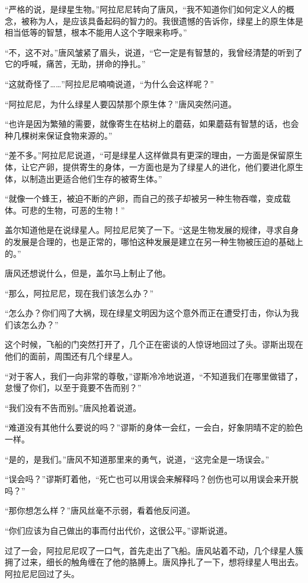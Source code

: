 “严格的说，是绿星生物。”阿拉尼尼转向了唐风，“我不知道你们如何定义人的概念，被称为人，是应该具备起码的智力的。我很遗憾的告诉你，绿星上的原生体是相当低等的智慧，根本不能用人这个字眼来称呼。”

“不，这不对。”唐风皱紧了眉头，说道，“它一定是有智慧的，我曾经清楚的听到了它的呼喊，痛苦，无助，拼命的挣扎。”

“这就奇怪了……”阿拉尼尼喃喃说道，“为什么会这样呢？”

“阿拉尼尼，为什么绿星人要囚禁那个原生体？”唐风突然问道。

“也许是因为繁殖的需要，就像寄生在枯树上的蘑菇，如果蘑菇有智慧的话，也会种几棵树来保证食物来源的。”

“差不多。”阿拉尼尼说道，“可是绿星人这样做具有更深的理由，一方面是保留原生体，让它产卵，提供寄生的身体，一方面也是为了绿星人的进化，他们要进化原生体，以制造出更适合他们生存的被寄生体。”

“就像一个蜂王，被迫不断的产卵，而自己的孩子却被另一种生物吞噬，变成载体。可悲的生物，可恶的生物！”

盖尔知道他是在说绿星人。阿拉尼尼笑了一下。“这是生物发展的规律，寻求自身的发展是合理的，也是正常的，哪怕这种发展是建立在另一种生物被压迫的基础上的。”

唐风还想说什么，但是，盖尔马上制止了他。

“那么，阿拉尼尼，现在我们该怎么办？”

“怎么办？你们闯了大祸，现在绿星文明因为这个意外而正在遭受打击，你认为我们该怎么办？”

这个时候，飞船的门突然打开了，几个正在密谈的人惊讶地回过了头。谬斯出现在他们的面前，周围还有几个绿星人。

“对于客人，我们一向非常的尊敬，”谬斯冷冷地说道，“不知道我们在哪里做错了，怠慢了你们，以至于竟要不告而别？”

“我们没有不告而别。”唐风抢着说道。

“难道没有其他什么要说的吗？”谬斯的身体一会红，一会白，好象阴晴不定的脸色一样。

“是的，是我们。”唐风不知道那里来的勇气，说道，“这完全是一场误会。”

“误会吗？”谬斯盯着他，“死亡也可以用误会来解释吗？创伤也可以用误会来开脱吗？”

“那你想怎么样？”唐风丝毫不示弱，看着他反问道。

“你们应该为自己做出的事而付出代价，这很公平。”谬斯说道。

过了一会，阿拉尼尼叹了一口气，首先走出了飞船。唐风站着不动，几个绿星人簇拥了过来，细长的触角缠在了他的胳膊上。唐风挣扎了一下，想将绿星人甩出去。阿拉尼尼回过了头。

